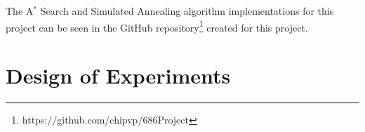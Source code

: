 \documentclass[conference]{IEEEtran}
\begin{document}
The A$^*$ Search and Simulated Annealing algorithm implementations for this
project 
can be seen in the
GitHub repository\footnote{https://github.com/chipvp/686Project} created for
this project.

\section{Design of Experiments} \label{sec:experiment}

% 
% 
% 
 
\end{document}
